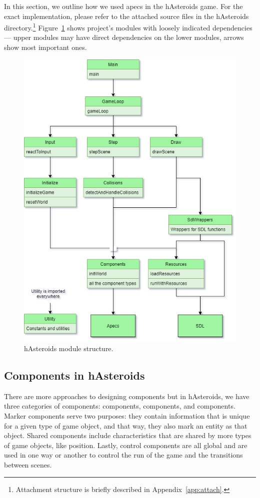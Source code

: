 \documentclass[
  digital, %
  color,   %
  table,   %
  oneside, %
  lof,     %
  lot,     %
]{fithesis3}
\begin{document}
\noindent In this section, we outline how we used apecs in the hAsteroids game.
For the exact implementation, please refer to the attached source files
in the hAsteroids directory.\footnote{
Attachment structure is briefly described in Appendix~\ref{app:attach}.}
Figure~\ref{fig:hasteroidsmodules} shows project's modules with loosely indicated
dependencies --- upper modules may have direct dependencies on the lower modules,
arrows show most important ones.
\begin{figure}
    \centering
    \includegraphics[width=\textwidth]{images/modules.png}
    \caption{hAsteroids module structure.}
    \label{fig:hasteroidsmodules}
\end{figure}


\subsection{Components in hAsteroids}
There are more approaches to designing components but in hAsteroids,
we have three categories of components:  components,
 components, and  components. Marker components serve two purposes:
they contain information that is unique for a given type of game object,
and that way, they also mark an entity as that object.
Shared components include characteristics that are shared by more types
of game objects, like position. Lastly, control components are all global
and are used in one way or another to control the run of the game and the transitions between scenes.
\end{document}
